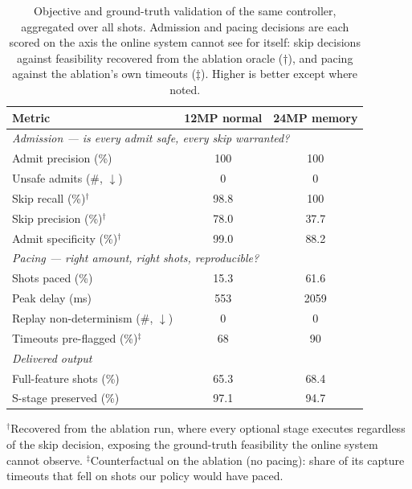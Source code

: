 \begin{table}[t]
  \centering
  \caption{Objective and ground-truth validation of the same controller, aggregated
  over all shots. Admission and pacing decisions are each scored on the axis the
  online system cannot see for itself: skip decisions against feasibility recovered
  from the ablation oracle ($\dagger$), and pacing against the ablation's own timeouts
  ($\ddagger$). Higher is better except where noted.}
  \label{tab:validation}
  \setlength{\tabcolsep}{6pt}%
  \renewcommand{\arraystretch}{1.2}%
  \begin{tabular}{l c c}
  \toprule \midrule
  \textbf{Metric} & \textbf{12MP normal} & \textbf{24MP memory} \\
  \midrule
  \multicolumn{3}{l}{\textit{Admission --- is every admit safe, every skip warranted?}} \\
  \quad Admit precision (\%) & 100 & 100 \\
  \quad Unsafe admits (\#, $\downarrow$) & 0 & 0 \\
  \quad Skip recall (\%)$^{\dagger}$ & 98.8 & 100\phantom{.0} \\
  \quad Skip precision (\%)$^{\dagger}$ & 78.0 & 37.7 \\
  \quad Admit specificity (\%)$^{\dagger}$ & 99.0 & 88.2 \\
  \midrule
  \multicolumn{3}{l}{\textit{Pacing --- right amount, right shots, reproducible?}} \\
  \quad Shots paced (\%) & 15.3 & 61.6 \\
  \quad Peak delay (ms) & 553 & 2059 \\
  \quad Replay non-determinism (\#, $\downarrow$) & 0 & 0 \\
  \quad Timeouts pre-flagged (\%)$^{\ddagger}$ & 68\phantom{.0} & 90\phantom{.0} \\
  \midrule
  \multicolumn{3}{l}{\textit{Delivered output}} \\
  \quad Full-feature shots (\%) & 65.3 & 68.4 \\
  \quad S-stage preserved (\%) & 97.1 & 94.7 \\
  \midrule \bottomrule
  \end{tabular}
  \par\vspace{3pt}
  {\footnotesize $^{\dagger}$Recovered from the ablation run, where every optional stage
  executes regardless of the skip decision, exposing the ground-truth feasibility the
  online system cannot observe. $^{\ddagger}$Counterfactual on the ablation (no pacing):
  share of its capture timeouts that fell on shots our policy would have paced.}
\end{table}
